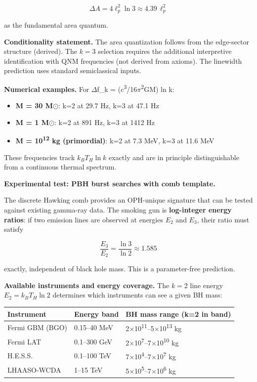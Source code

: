 \documentclass[11pt,a4paper]{article}
\theoremstyle{remark}
\providecommand{\tightlist}{%
  \setlength{\itemsep}{0pt}\setlength{\parskip}{0pt}}
\begin{document}
\[
\Delta A = 4\ell_p^2 \ln 3 \approx 4.39 \, \ell_p^2
\]

as the fundamental area quantum.

\textbf{Conditionality statement.} The area quantization follows from the
edge-sector structure (derived). The \(k = 3\) selection requires the
additional interpretive identification with QNM frequencies (not derived
from axioms). The linewidth prediction uses standard semiclassical inputs.

\textbf{Numerical examples.} For \ensuremath{\Delta}f\_k = (c\textsuperscript{3}/16\ensuremath{\pi}\textsuperscript{2}GM) ln k:

\begin{itemize}
\tightlist
\item
  \textbf{M = 30 M\ensuremath{\odot}}: k=2 at 29.7 Hz, k=3 at 47.1 Hz
\item
  \textbf{M = 1 M\ensuremath{\odot}}: k=2 at 891 Hz, k=3 at 1412 Hz
\item
  \textbf{M = 10\textsuperscript{12} kg (primordial)}: k=2 at 7.3 MeV, k=3 at 11.6 MeV
\end{itemize}

These frequencies track \(k_B T_H \ln k\) exactly and are in principle
distinguishable from a continuous thermal spectrum.

\textbf{Experimental test: PBH burst searches with comb template.}

The discrete Hawking comb provides an OPH-unique signature that can be tested
against existing gamma-ray data. The smoking gun is \textbf{log-integer energy
ratios}: if two emission lines are observed at energies \(E_2\) and \(E_3\),
their ratio must satisfy

\[
\frac{E_3}{E_2} = \frac{\ln 3}{\ln 2} \approx 1.585
\]

exactly, independent of black hole mass. This is a parameter-free prediction.

\textbf{Available instruments and energy coverage.} The \(k = 2\) line energy
\(E_2 = k_B T_H \ln 2\) determines which instruments can see a given BH mass:

{\def\LTcaptype{none} %
\begin{longtable}[]{@{}lll@{}}
\toprule\noalign{}
Instrument & Energy band & BH mass range (k=2 in band) \\
\midrule\noalign{}
\endhead
\bottomrule\noalign{}
\endlastfoot
Fermi GBM (BGO) & 0.15--40 MeV & 2\ensuremath{\times}10\textsuperscript{11}--5\ensuremath{\times}10\textsuperscript{13} kg \\
Fermi LAT & 0.1--300 GeV & 2\ensuremath{\times}10\textsuperscript{7}--7\ensuremath{\times}10\textsuperscript{10} kg \\
H.E.S.S. & 0.1--100 TeV & 7\ensuremath{\times}10\textsuperscript{4}--7\ensuremath{\times}10\textsuperscript{7} kg \\
LHAASO-WCDA & 1--15 TeV & 5\ensuremath{\times}10\textsuperscript{5}--7\ensuremath{\times}10\textsuperscript{6} kg \\
\end{longtable}
}
\end{document}
